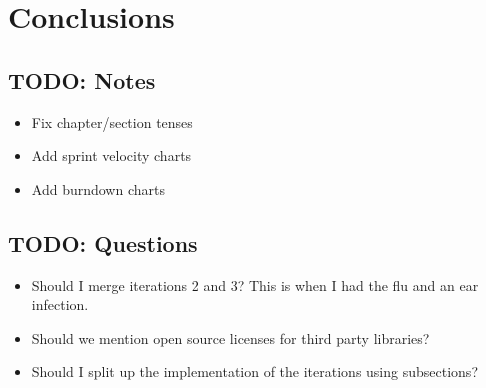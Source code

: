 \chapter{Conclusions}
\section{TODO: Notes}
\begin{itemize}
\item Fix chapter/section tenses
\item Add sprint velocity charts
\item Add burndown charts
\end{itemize}

\section{TODO: Questions}
\begin{itemize}
\item Should I merge iterations 2 and 3? This is when I had the flu and an ear infection.
\item Should we mention open source licenses for third party libraries?
\item Should I split up the implementation of the iterations using subsections?
\end{itemize}
